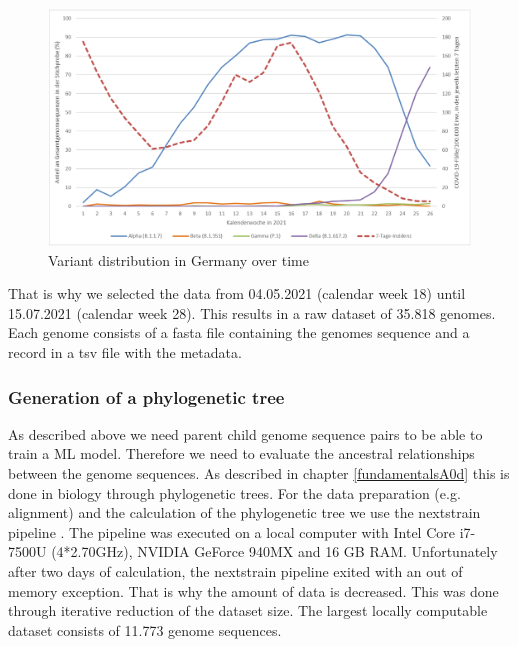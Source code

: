 \begin{figure}[ht]
	\centering
	\includegraphics[width=1.0\linewidth]{figures/rkiVariantDistribution.png}
	\caption{Variant distribution in Germany over time \cite{robertkochinstituteditorBerichtVirusvariantenSARSCoV22021}}
	\label{rkiVariantDistribution}
\end{figure}

That is why we selected the data from 04.05.2021 (calendar week 18) until 15.07.2021 (calendar week 28). This results in a raw dataset of 35.818 genomes.
Each genome consists of a fasta file containing the genomes sequence and a record in a tsv file with the metadata.



\subsubsection{Generation of a phylogenetic tree}
\label{ch:approachAb}

As described above we need parent child genome sequence pairs to be able to train a \ac{ML} model. Therefore we need to evaluate the ancestral relationships between the genome sequences.
As described in chapter \ref{fundamentalsA0d} this is done in biology through phylogenetic trees.
For the data preparation (e.g. alignment) and the calculation of the phylogenetic tree we use the nextstrain pipeline \cite{10.1093/bioinformatics/bty407}.
The pipeline was executed on a local computer with Intel Core i7-7500U (4*2.70GHz), NVIDIA GeForce 940MX and 16 GB RAM.
Unfortunately after two days of calculation, the nextstrain pipeline exited with an out of memory exception. That is why the amount of data is decreased. This was done through iterative reduction of the dataset size. The largest locally computable dataset consists of 11.773 genome sequences.

